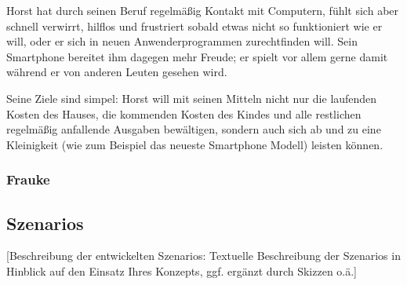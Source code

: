 Horst hat durch seinen Beruf regelm\"a\ss ig Kontakt mit Computern, f\"uhlt sich aber schnell verwirrt, hilflos und
frustriert sobald etwas nicht so funktioniert wie er will, oder er sich in neuen Anwenderprogrammen zurechtfinden will.
Sein Smartphone bereitet ihm dagegen mehr Freude; er spielt vor allem gerne damit w\"ahrend
er von anderen Leuten gesehen wird.

Seine Ziele sind simpel: Horst will mit seinen Mitteln nicht nur die laufenden Kosten des Hauses,
die kommenden Kosten des Kindes und alle restlichen regelm\"a\ss ig anfallende Ausgaben bew\"altigen,
sondern auch sich ab und zu eine Kleinigkeit (wie zum Beispiel das neueste Smartphone Modell) leisten k\"onnen.

\subsubsection{Frauke}

\subsection{Szenarios}

[Beschreibung der entwickelten Szenarios: Textuelle Beschreibung der Szenarios in Hinblick auf den Einsatz Ihres Konzepts, ggf. ergänzt durch Skizzen o.ä.]
